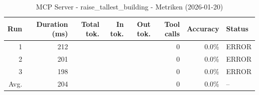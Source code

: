 \begin{table}[ht]
\centering
\small
\caption{MCP Server - raise\_tallest\_building - Metriken (2026-01-20)}
\label{tab:mcp\_raise\_tallest\_building\_metrics\_2026-01-20}
\begin{tabular}{r r r r r r r l}
\hline
Run & Duration (ms) & Total tok. & In tok. & Out tok. & Tool calls & Accuracy & Status \\
\hline
1 & 212 &  &  &  & 0 & 0.0\% & ERROR \\
2 & 201 &  &  &  & 0 & 0.0\% & ERROR \\
3 & 198 &  &  &  & 0 & 0.0\% & ERROR \\
\hline
Avg. & 204 &  &  &  & 0 & 0.0\% & -- \\
\hline
\end{tabular}
\end{table}
